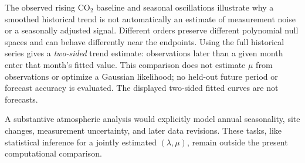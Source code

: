 The observed rising CO$_2$ baseline and seasonal
oscillations illustrate why a smoothed historical trend is
not automatically an estimate of measurement noise or a
seasonally adjusted signal. Different orders preserve
different polynomial null spaces and can behave
differently near the endpoints. Using the full historical
series gives a \emph{two-sided} trend estimate: observations
later than a given month enter that month's fitted value.
This comparison does not estimate $\mu$ from observations or optimize
a Gaussian likelihood; no held-out future period or forecast accuracy
is evaluated. The displayed two-sided fitted curves are not forecasts.

A substantive atmospheric analysis would explicitly model
annual seasonality, site changes, measurement uncertainty,
and later data revisions. These tasks, like statistical
inference for a jointly estimated $(\lambda,\mu)$, remain
outside the present computational comparison.
